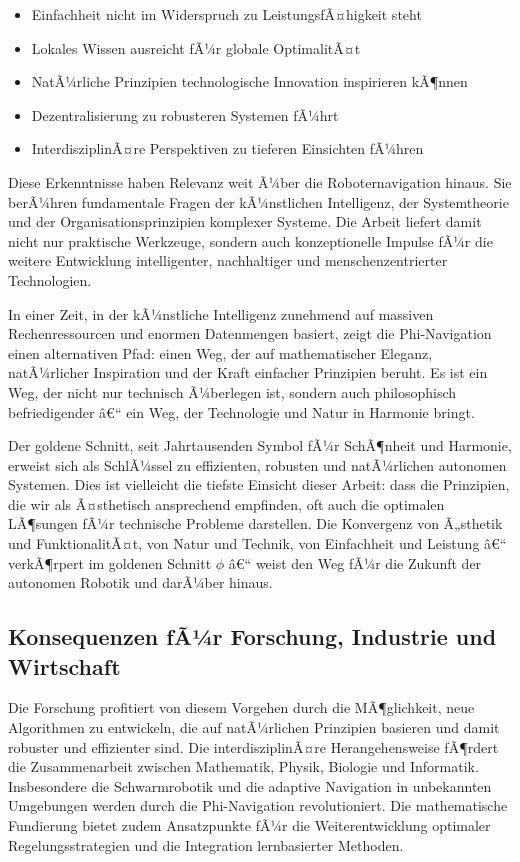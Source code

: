 ﻿\documentclass[a4paper,12pt]{article}
\theoremstyle{definition}
\begin{document}
\begin{itemize}
	\item Einfachheit nicht im Widerspruch zu LeistungsfÃ¤higkeit steht
	\item Lokales Wissen ausreicht fÃ¼r globale OptimalitÃ¤t
	\item NatÃ¼rliche Prinzipien technologische Innovation inspirieren kÃ¶nnen
	\item Dezentralisierung zu robusteren Systemen fÃ¼hrt
	\item InterdisziplinÃ¤re Perspektiven zu tieferen Einsichten fÃ¼hren
\end{itemize}

Diese Erkenntnisse haben Relevanz weit Ã¼ber die Roboternavigation hinaus. Sie berÃ¼hren fundamentale Fragen der kÃ¼nstlichen Intelligenz, der Systemtheorie und der Organisationsprinzipien komplexer Systeme. Die Arbeit liefert damit nicht nur praktische Werkzeuge, sondern auch konzeptionelle Impulse fÃ¼r die weitere Entwicklung intelligenter, nachhaltiger und menschenzentrierter Technologien.

In einer Zeit, in der kÃ¼nstliche Intelligenz zunehmend auf massiven Rechenressourcen und enormen Datenmengen basiert, zeigt die Phi-Navigation einen alternativen Pfad: einen Weg, der auf mathematischer Eleganz, natÃ¼rlicher Inspiration und der Kraft einfacher Prinzipien beruht. Es ist ein Weg, der nicht nur technisch Ã¼berlegen ist, sondern auch philosophisch befriedigender â€“ ein Weg, der Technologie und Natur in Harmonie bringt.

Der goldene Schnitt, seit Jahrtausenden Symbol fÃ¼r SchÃ¶nheit und Harmonie, erweist sich als SchlÃ¼ssel zu effizienten, robusten und natÃ¼rlichen autonomen Systemen. Dies ist vielleicht die tiefste Einsicht dieser Arbeit: dass die Prinzipien, die wir als Ã¤sthetisch ansprechend empfinden, oft auch die optimalen LÃ¶sungen fÃ¼r technische Probleme darstellen. Die Konvergenz von Ã„sthetik und FunktionalitÃ¤t, von Natur und Technik, von Einfachheit und Leistung â€“ verkÃ¶rpert im goldenen Schnitt $\phi$ â€“ weist den Weg fÃ¼r die Zukunft der autonomen Robotik und darÃ¼ber hinaus.

\subsection{Konsequenzen fÃ¼r Forschung, Industrie und Wirtschaft}

Die Forschung profitiert von diesem Vorgehen durch die MÃ¶glichkeit, neue Algorithmen zu entwickeln, die auf natÃ¼rlichen Prinzipien basieren und damit robuster und effizienter sind. Die interdisziplinÃ¤re Herangehensweise fÃ¶rdert die Zusammenarbeit zwischen Mathematik, Physik, Biologie und Informatik. Insbesondere die Schwarmrobotik und die adaptive Navigation in unbekannten Umgebungen werden durch die Phi-Navigation revolutioniert. Die mathematische Fundierung bietet zudem Ansatzpunkte fÃ¼r die Weiterentwicklung optimaler Regelungsstrategien und die Integration lernbasierter Methoden.
\end{document}
